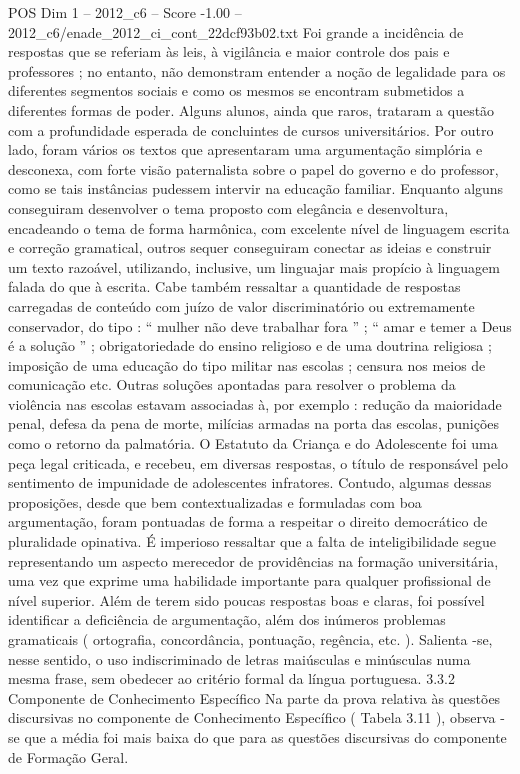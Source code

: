 \begin{textsample}{POS Dim 1 – 2012\_c6 – Score -1.00 – 2012\_c6/enade\_2012\_ci\_cont\_22dcf93b02.txt}
Foi grande a incidência de respostas que se referiam às leis, à vigilância e maior controle dos pais e professores ; no entanto, não demonstram entender a noção de legalidade para os diferentes segmentos sociais e como os mesmos se encontram submetidos a diferentes formas de poder.
Alguns alunos, ainda que raros, trataram a questão com a profundidade esperada de concluintes de cursos universitários.
Por outro lado, foram vários os textos que apresentaram uma argumentação simplória e desconexa, com forte visão paternalista sobre o papel do governo e do professor, como se tais instâncias pudessem intervir na educação familiar.
Enquanto alguns conseguiram desenvolver o tema proposto com elegância e desenvoltura, encadeando o tema de forma harmônica, com excelente nível de linguagem escrita e correção gramatical, outros sequer conseguiram conectar as ideias e construir um texto razoável, utilizando, inclusive, um linguajar mais propício à linguagem falada do que à escrita.
Cabe também ressaltar a quantidade de respostas carregadas de conteúdo com juízo de valor discriminatório ou extremamente conservador, do tipo : “ mulher não deve trabalhar fora ” ; “ amar e temer a Deus é a solução ” ; obrigatoriedade do ensino religioso e de uma doutrina religiosa ; imposição de uma educação do tipo militar nas escolas ; censura nos meios de comunicação etc.
Outras soluções apontadas para resolver o problema da violência nas escolas estavam associadas à, por exemplo : redução da maioridade penal, defesa da pena de morte, milícias armadas na porta das escolas, punições como o retorno da palmatória.
O Estatuto da Criança e do Adolescente foi uma peça legal criticada, e recebeu, em diversas respostas, o título de responsável pelo sentimento de impunidade de adolescentes infratores.
Contudo, algumas dessas proposições, desde que bem contextualizadas e formuladas com boa argumentação, foram pontuadas de forma a respeitar o direito democrático de pluralidade opinativa.
É imperioso ressaltar que a falta de inteligibilidade segue representando um aspecto merecedor de providências na formação universitária, uma vez que exprime uma habilidade importante para qualquer profissional de nível superior.
Além de terem sido poucas respostas boas e claras, foi possível identificar a deficiência de argumentação, além dos inúmeros problemas gramaticais ( ortografia, concordância, pontuação, regência, etc. ).
Salienta -se, nesse sentido, o uso indiscriminado de letras maiúsculas e minúsculas numa mesma frase, sem obedecer ao critério formal da língua portuguesa. 3.3.2 Componente de Conhecimento Específico Na parte da prova relativa às questões discursivas no componente de Conhecimento Específico ( Tabela 3.11 ), observa -se que a média foi mais baixa do que para as questões discursivas do componente de Formação Geral.

\end{textsample}
